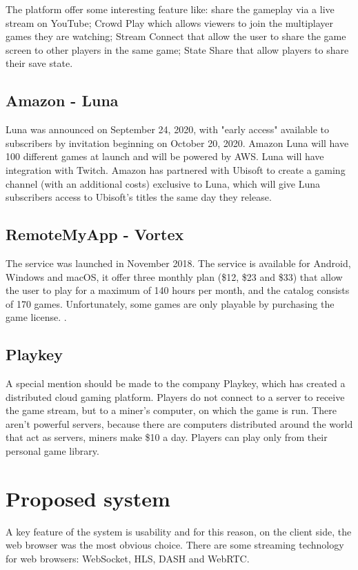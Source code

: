 The platform offer some interesting feature like: share the gameplay via a live stream on YouTube; Crowd Play which allows viewers to join the multiplayer games they are watching; Stream Connect that allow the user to share the game screen to other players in the same game; State Share that allow players to share their save state\cite{Google_Stadia}.

\subsection{Amazon - Luna}
Luna was announced on September 24, 2020, with "early access" available to subscribers by invitation beginning on October 20, 2020. Amazon Luna will have 100 different games at launch and will be powered by AWS. Luna will have integration with Twitch. Amazon has partnered with Ubisoft to create a gaming channel (with an additional costs) exclusive to Luna, which will give Luna subscribers access to Ubisoft's titles the same day they release\cite{Amazon_Luna}.

\subsection{RemoteMyApp - Vortex}
The service was launched in November 2018. The service is available for Android, Windows and macOS, it offer three monthly plan (\$12, \$23 and \$33) that allow the user to play for a maximum of 140 hours per month, and the catalog consists of 170 games. Unfortunately, some games are only playable by purchasing the game license.
\cite{RemoteMyApp_Vortex}.

\subsection{Playkey}
A special mention should be made to the company Playkey, which has created a distributed cloud gaming platform. Players do not connect to a server to receive the game stream, but to a miner's computer, on which the game is run. There aren't powerful servers, because there are computers distributed around the world that act as servers, miners make \$10 a day. Players can play only from their personal game library\cite{Playkey}.

\section{Proposed system}
A key feature of the system is usability and for this reason, on the client side, the web browser was the most obvious choice.
There are some streaming technology for web browsers: WebSocket, HLS, DASH and WebRTC\cite{Audio_and_video_delivery}.

